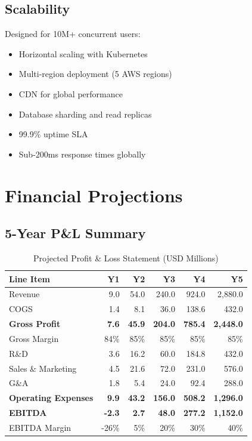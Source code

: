 \subsection{Scalability}

Designed for 10M+ concurrent users:

\begin{itemize}
    \item Horizontal scaling with Kubernetes
    \item Multi-region deployment (5 AWS regions)
    \item CDN for global performance
    \item Database sharding and read replicas
    \item 99.9\% uptime SLA
    \item Sub-200ms response times globally
\end{itemize}

\section{Financial Projections}

\subsection{5-Year P\&L Summary}

\begin{table}[H]
\centering
\caption{Projected Profit \& Loss Statement (USD Millions)}
\begin{tabular}{|l|r|r|r|r|r|}
\hline
\rowcolor{lightgray}
\textbf{Line Item} & \textbf{Y1} & \textbf{Y2} & \textbf{Y3} & \textbf{Y4} & \textbf{Y5} \\
\hline
Revenue & 9.0 & 54.0 & 240.0 & 924.0 & 2,880.0 \\
\hline
COGS & 1.4 & 8.1 & 36.0 & 138.6 & 432.0 \\
\hline
\textbf{Gross Profit} & \textbf{7.6} & \textbf{45.9} & \textbf{204.0} & \textbf{785.4} & \textbf{2,448.0} \\
\hline
Gross Margin & 84\% & 85\% & 85\% & 85\% & 85\% \\
\hline
R\&D & 3.6 & 16.2 & 60.0 & 184.8 & 432.0 \\
\hline
Sales \& Marketing & 4.5 & 21.6 & 72.0 & 231.0 & 576.0 \\
\hline
G\&A & 1.8 & 5.4 & 24.0 & 92.4 & 288.0 \\
\hline
\textbf{Operating Expenses} & \textbf{9.9} & \textbf{43.2} & \textbf{156.0} & \textbf{508.2} & \textbf{1,296.0} \\
\hline
\textbf{EBITDA} & \textbf{-2.3} & \textbf{2.7} & \textbf{48.0} & \textbf{277.2} & \textbf{1,152.0} \\
\hline
EBITDA Margin & -26\% & 5\% & 20\% & 30\% & 40\% \\
\hline
\end{tabular}
\end{table}

